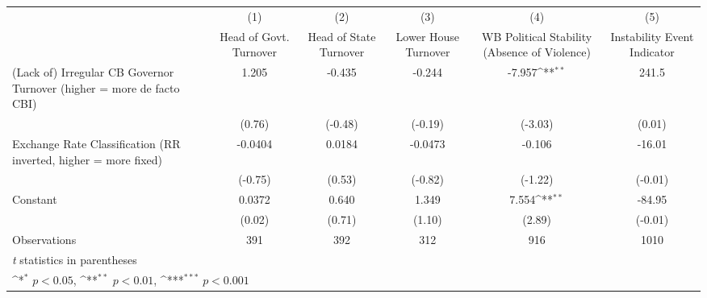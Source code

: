 {
\def\sym#1{\ifmmode^{#1}\else\(^{#1}\)\fi}
\begin{tabular*}{\linewidth}{@{\hskip\tabcolsep\extracolsep\fill}l*{5}{c}}
\hline\hline
                &\multicolumn{1}{c}{(1)}&\multicolumn{1}{c}{(2)}&\multicolumn{1}{c}{(3)}&\multicolumn{1}{c}{(4)}&\multicolumn{1}{c}{(5)}\\
                &\multicolumn{1}{c}{Head of Govt. Turnover}&\multicolumn{1}{c}{Head of State Turnover}&\multicolumn{1}{c}{Lower House Turnover}&\multicolumn{1}{c}{WB Political Stability (Absence of Violence)}&\multicolumn{1}{c}{Instability Event Indicator}\\
\hline
(Lack of) Irregular CB Governor Turnover (higher = more de facto CBI)&    1.205         &   -0.435         &   -0.244         &   -7.957\sym{**} &    241.5         \\
                &   (0.76)         &  (-0.48)         &  (-0.19)         &  (-3.03)         &   (0.01)         \\
[1em]
Exchange Rate Classification (RR inverted, higher = more fixed)&  -0.0404         &   0.0184         &  -0.0473         &   -0.106         &   -16.01         \\
                &  (-0.75)         &   (0.53)         &  (-0.82)         &  (-1.22)         &  (-0.01)         \\
[1em]
Constant        &   0.0372         &    0.640         &    1.349         &    7.554\sym{**} &   -84.95         \\
                &   (0.02)         &   (0.71)         &   (1.10)         &   (2.89)         &  (-0.01)         \\
\hline
Observations    &      391         &      392         &      312         &      916         &     1010         \\
\hline\hline
\multicolumn{6}{l}{\footnotesize \textit{t} statistics in parentheses}\\
\multicolumn{6}{l}{\footnotesize \sym{*} \(p<0.05\), \sym{**} \(p<0.01\), \sym{***} \(p<0.001\)}\\
\end{tabular*}
}
